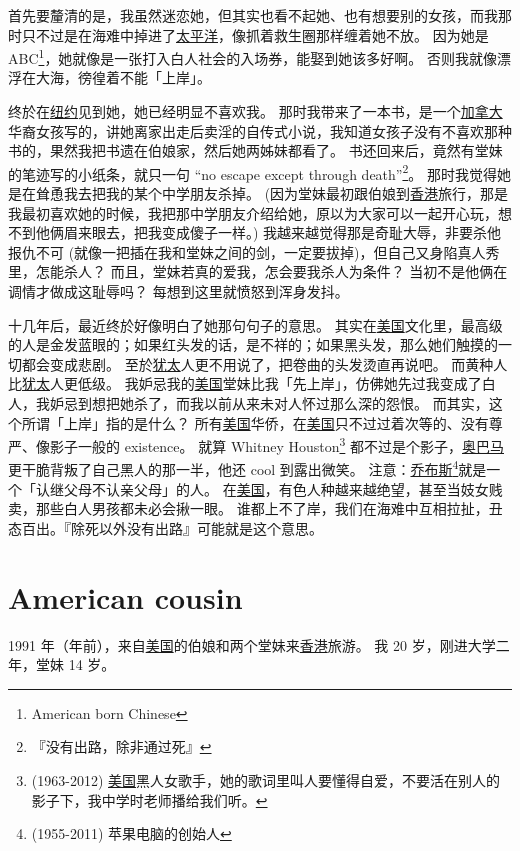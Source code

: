 \documentclass[12pt]{report}
\begin{document}
首先要釐清的是，我虽然迷恋她，但其实也看不起她、也有想要别的女孩，而我那时只不过是在海难中掉进了\underline{太平洋}，像抓着救生圈那样缠着她不放。 因为她是 ABC\footnote{American born Chinese}，她就像是一张打入白人社会的入场券，能娶到她该多好啊。 否则我就像漂浮在大海，徬徨着不能「上岸」。

终於在\underline{纽约}见到她，她已经明显不喜欢我。 那时我带来了一本书，是一个\underline{加拿大}华裔女孩写的，讲她离家出走后卖淫的自传式小说，我知道女孩子没有不喜欢那种书的，果然我把书遗在伯娘家，然后她两姊妹都看了。 书还回来后，竟然有堂妹的笔迹写的小纸条，就只一句 ``no escape except through death''\footnote{『没有出路，除非通过死』}。 那时我觉得她是在耸恿我去把我的某个中学朋友杀掉。 (因为堂妹最初跟伯娘到\underline{香港}旅行，那是我最初喜欢她的时候，我把那中学朋友介绍给她，原以为大家可以一起开心玩，想不到他俩眉来眼去，把我变成傻子一样。) 我越来越觉得那是奇耻大辱，非要杀他报仇不可 (就像一把插在我和堂妹之间的剑，一定要拔掉)，但自己又身陷真人秀里，怎能杀人？ 而且，堂妹若真的爱我，怎会要我杀人为条件？ 当初不是他俩在调情才做成这耻辱吗？ 每想到这里就愤怒到浑身发抖。

十几年后，最近终於好像明白了她那句句子的意思。 其实在\underline{美国}文化里，最高级的人是金发蓝眼的；如果红头发的话，是不祥的；如果黑头发，那么她们触摸的一切都会变成悲剧。 至於\underline{犹太}人更不用说了，把卷曲的头发烫直再说吧。 而黄种人比\underline{犹太}人更低级。 我妒忌我的\underline{美国}堂妹比我「先上岸」，仿佛她先过我变成了白人，我妒忌到想把她杀了，而我以前从来未对人怀过那么深的怨恨。 而其实，这个所谓「上岸」指的是什么？ 所有\underline{美国}华侨，在\underline{美国}只不过过着次等的、没有尊严、像影子一般的 existence。 就算 Whitney Houston\footnote{(1963-2012) \underline{美国}黑人女歌手，她的歌词里叫人要懂得自爱，不要活在别人的影子下，我中学时老师播给我们听。} 都不过是个影子，\underline{奥巴马}更干脆背叛了自己黑人的那一半，他还 cool 到露出微笑。  注意：\underline{乔布斯}\footnote{(1955-2011) 苹果电脑的创始人}就是一个「认继父母不认亲父母」的人。 在\underline{美国}，有色人种越来越绝望，甚至当妓女贱卖，那些白人男孩都未必会揪一眼。 谁都上不了岸，我们在海难中互相拉扯，丑态百出。『除死以外没有出路』可能就是这个意思。

\chapter{American cousin}

1991 年（\resultb 年前），来自\underline{美国}的伯娘和两个堂妹来\underline{香港}旅游。 我 20 岁，刚进大学二年，堂妹 14 岁。
\end{document}
